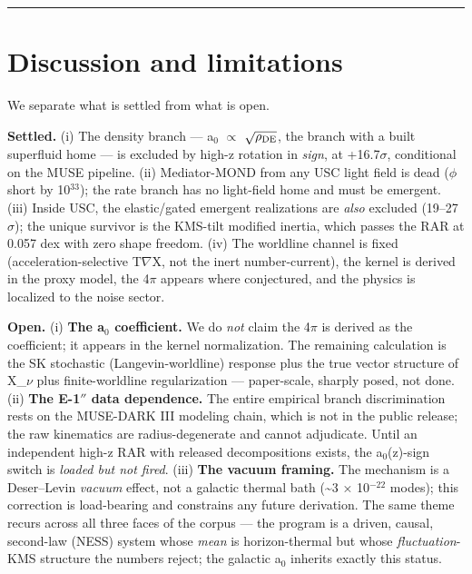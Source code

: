 \documentclass[aps,prd,preprint,nofootinbib,superscriptaddress]{revtex4-2}
\begin{document}
\begin{center}\rule{0.5\linewidth}{0.5pt}\end{center}

\section{Discussion and limitations}\label{sec-8}

We separate what is settled from what is open.

\textbf{Settled.} (i) The density branch --- a\(_{0}\) \(\propto\)
\(\sqrt{\rho_{\rm DE}}\), the branch with a built superfluid home --- is
excluded by high-z rotation in \emph{sign}, at +16.7\(\sigma\),
conditional on the MUSE pipeline. (ii) Mediator-MOND from any USC light
field is dead (\(\phi\) short by 10\(^{33}\)); the rate branch has no
light-field home and must be emergent. (iii) Inside USC, the
elastic/gated emergent realizations are \emph{also} excluded
(19--27\(\sigma\)); the unique survivor is the KMS-tilt modified
inertia, which passes the RAR at 0.057 dex with zero shape freedom. (iv)
The worldline channel is fixed (acceleration-selective T\(\nabla\)X, not
the inert number-current), the kernel is derived in the proxy model, the
4\(\pi\) appears where conjectured, and the physics is localized to the
noise sector.

\textbf{Open.} (i) \textbf{The a\(_{0}\) coefficient.} We do \emph{not}
claim the 4\(\pi\) is derived as the coefficient; it appears in the
kernel normalization. The remaining calculation is the SK stochastic
(Langevin-worldline) response plus the true vector structure of
X\_\(\nu\) plus finite-worldline regularization --- paper-scale, sharply
posed, not done. (ii) \textbf{The E-1\(''\) data dependence.} The entire
empirical branch discrimination rests on the MUSE-DARK III modeling
chain, which is not in the public release; the raw kinematics are
radius-degenerate and cannot adjudicate. Until an independent high-z RAR
with released decompositions exists, the a\(_{0}\)(z)-sign switch is
\emph{loaded but not fired}. (iii) \textbf{The vacuum framing.} The
mechanism is a Deser--Levin \emph{vacuum} effect, not a galactic thermal
bath (\textasciitilde3 × 10\(^{-22}\) modes); this correction is
load-bearing and constrains any future derivation. The same theme recurs
across all three faces of the corpus --- the program is a driven,
causal, second-law (NESS) system whose \emph{mean} is horizon-thermal
but whose \emph{fluctuation}-KMS structure the numbers reject; the
galactic a\(_{0}\) inherits exactly this status.
\end{document}
